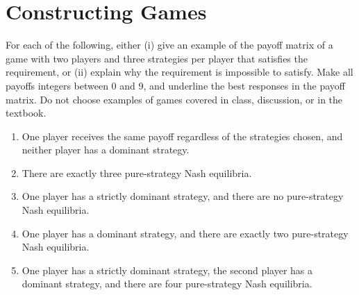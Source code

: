 \documentclass{assignment}
\begin{document}
\section{Constructing Games}

\begin{problem}
    For each of the following, either (i) give an example of the payoff matrix of a
    game with two players and three strategies per player that satisfies the
    requirement, or (ii) explain why the requirement is impossible to satisfy.
    Make all payoffs integers between 0 and 9, and underline the best responses in
    the payoff matrix. Do not choose examples of games covered in class, discussion,
    or in the textbook.

    \begin{enumerate}
        \item[(a)] One player receives the same payoff regardless of the strategies
              chosen, and neither player has a dominant strategy.
        \item[(b)] There are exactly three pure-strategy Nash equilibria.
        \item[(c)] One player has a strictly dominant strategy, and there are no
              pure-strategy Nash equilibria.
        \item[(d)] One player has a dominant strategy, and there are exactly two
              pure-strategy Nash equilibria.
        \item[(e)] One player has a strictly dominant strategy, the second player
              has a dominant strategy, and there are four pure-strategy Nash equilibria.
    \end{enumerate}
\end{problem}
\end{document}
